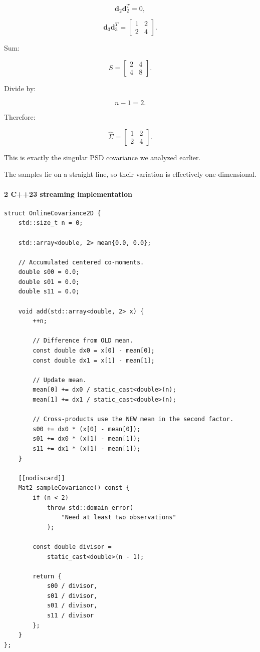 \[
 \mathbf d_2\mathbf d_2^T=0,
\]

\[
 \mathbf d_3\mathbf d_3^T= \begin{bmatrix}1&2\\2&4\end{bmatrix}.
\]

Sum:

\[
 S= \begin{bmatrix} 2&4\\4&8 \end{bmatrix}.
\]

Divide by:

\[
 n-1=2.
\]

Therefore:

\[
 \boxed{ \widehat\Sigma= \begin{bmatrix} 1&2\\ 2&4 \end{bmatrix} }.
\]

This is exactly the singular PSD covariance we analyzed earlier.

The samples lie on a straight line, so their variation is effectively one-dimensional.

\paragraph{2 C++23 streaming implementation}\label{c23-streaming-implementation}

\begin{verbatim}
struct OnlineCovariance2D {
    std::size_t n = 0;

    std::array<double, 2> mean{0.0, 0.0};

    // Accumulated centered co-moments.
    double s00 = 0.0;
    double s01 = 0.0;
    double s11 = 0.0;

    void add(std::array<double, 2> x) {
        ++n;

        // Difference from OLD mean.
        const double dx0 = x[0] - mean[0];
        const double dx1 = x[1] - mean[1];

        // Update mean.
        mean[0] += dx0 / static_cast<double>(n);
        mean[1] += dx1 / static_cast<double>(n);

        // Cross-products use the NEW mean in the second factor.
        s00 += dx0 * (x[0] - mean[0]);
        s01 += dx0 * (x[1] - mean[1]);
        s11 += dx1 * (x[1] - mean[1]);
    }

    [[nodiscard]]
    Mat2 sampleCovariance() const {
        if (n < 2)
            throw std::domain_error(
                "Need at least two observations"
            );

        const double divisor =
            static_cast<double>(n - 1);

        return {
            s00 / divisor,
            s01 / divisor,
            s01 / divisor,
            s11 / divisor
        };
    }
};
\end{verbatim}

